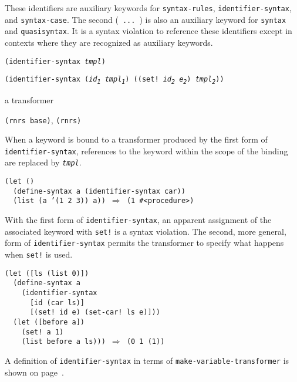 These identifiers are auxiliary keywords for \texttt{syntax-rules},
\texttt{identifier-syntax}, and \texttt{syntax-case}.
The second ( \texttt{...} ) is also an auxiliary keyword for
\texttt{syntax} and \texttt{quasisyntax}.
It is a syntax violation to reference these identifiers except in
contexts where they are recognized as auxiliary keywords.


\begin{description}

\label{syntax_s27}\item[syntax] \texttt{(identifier-syntax \textit{tmpl})}



\item[syntax] \texttt{(identifier-syntax (\textit{id\textsubscript{1}} \textit{tmpl\textsubscript{1}}) ((set! \textit{id\textsubscript{2}} \textit{e\textsubscript{2}}) \textit{tmpl\textsubscript{2}}))}



\item[returns] a transformer


\item[libraries] \texttt{(rnrs base)}, \texttt{(rnrs)}
\end{description}


When a keyword is bound to a transformer produced by the first form of
\texttt{identifier-syntax}, references to the keyword within the scope
of the binding are replaced by \texttt{\textit{tmpl}}.


\begin{alltt}
(let ()
  (define-syntax a (identifier-syntax car))
  (list (a '(1 2 3)) a)) \(\Rightarrow\) (1 \#{}\textless{}procedure\textgreater{})
\end{alltt}


With the first form of \texttt{identifier-syntax}, an apparent assignment
of the associated keyword with \texttt{set!} is a syntax violation.
The second, more general, form of \texttt{identifier-syntax} permits
the transformer to specify what happens when \texttt{set!} is used.


\begin{alltt}
(let ([ls (list 0)])
  (define-syntax a
    (identifier-syntax
      [id (car ls)]
      [(set! id e) (set-car! ls e)]))
  (let ([before a])
    (set! a 1)
    (list before a ls))) \(\Rightarrow\) (0 1 (1))
\end{alltt}


\label{syntax_s28}A definition of \texttt{identifier-syntax} in terms of
\texttt{make-variable-transformer} is shown on
page \pageref{syntax_defn_identifier_syntax}.


